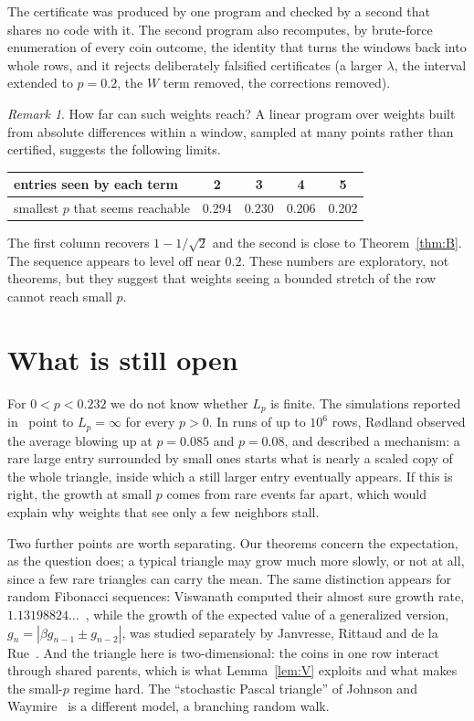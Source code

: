\documentclass[11pt]{article}
\theoremstyle{remark}
\newtheorem*{remark}{Remark}
\begin{document}
The certificate was produced by one program and checked by a second that shares no code with it. The second program also recomputes, by brute-force enumeration of every coin outcome, the identity that turns the windows back into whole rows, and it rejects deliberately falsified certificates (a larger $\lambda$, the interval extended to $p=0.2$, the $W$ term removed, the corrections removed).

\begin{remark}
How far can such weights reach? A linear program over weights built from absolute differences within a window, sampled at many points rather than certified, suggests the following limits.
\begin{center}
\begin{tabular}{lcccc}
\toprule
entries seen by each term & 2 & 3 & 4 & 5\\
\midrule
smallest $p$ that seems reachable & 0.294 & 0.230 & 0.206 & 0.202\\
\bottomrule
\end{tabular}
\end{center}
The first column recovers $1-1/\sqrt2$ and the second is close to Theorem~\ref{thm:B}. The sequence appears to level off near $0.2$. These numbers are exploratory, not theorems, but they suggest that weights seeing a bounded stretch of the row cannot reach small $p$.
\end{remark}

\section{What is still open}\label{sec:open}

For $0<p<0.232$ we do not know whether $L_p$ is finite. The simulations reported in~\cite{Rodland} point to $L_p=\infty$ for every $p>0$. In runs of up to $10^6$ rows, R{\o}dland observed the average blowing up at $p=0.085$ and $p=0.08$, and described a mechanism: a rare large entry surrounded by small ones starts what is nearly a scaled copy of the whole triangle, inside which a still larger entry eventually appears. If this is right, the growth at small $p$ comes from rare events far apart, which would explain why weights that see only a few neighbors stall.

Two further points are worth separating. Our theorems concern the expectation, as the question does; a typical triangle may grow much more slowly, or not at all, since a few rare triangles can carry the mean. The same distinction appears for random Fibonacci sequences: Viswanath computed their almost sure growth rate, $1.13198824\ldots$~\cite{Viswanath}, while the growth of the expected value of a generalized version, $g_n=|\beta g_{n-1}\pm g_{n-2}|$, was studied separately by Janvresse, Rittaud and de la Rue~\cite{JRR}. And the triangle here is two-dimensional: the coins in one row interact through shared parents, which is what Lemma~\ref{lem:V} exploits and what makes the small-$p$ regime hard. The ``stochastic Pascal triangle'' of Johnson and Waymire~\cite{Johnson} is a different model, a branching random walk.
\end{document}
